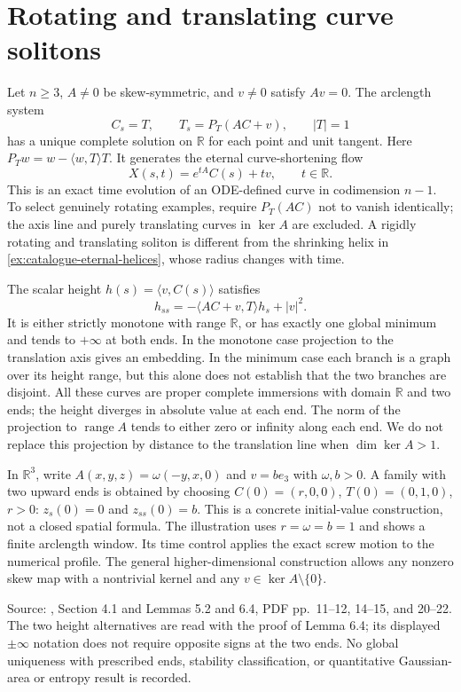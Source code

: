 \chapter{Rotating and translating curve solitons}\label{sec:catalogue-rotating-translating-curves}
\begin{example}\label{ex:catalogue-rotating-translating-curves}
Let $n\geq3$, $A\ne0$ be skew-symmetric, and $v\ne0$ satisfy $Av=0$. The arclength system
\[
 C_s=T,\qquad T_s=P_T(AC+v),\qquad |T|=1
\]
has a unique complete solution on $\mathbb R$ for each point and unit tangent. Here $P_Tw=w-\langle w,T\rangle T$. It generates the eternal curve-shortening flow
\[
 X(s,t)=e^{tA}C(s)+tv,\qquad t\in\mathbb R.
\]
This is an exact time evolution of an ODE-defined curve in codimension $n-1$. To select genuinely rotating examples, require $P_T(AC)$ not to vanish identically; the axis line and purely translating curves in $\ker A$ are excluded. A rigidly rotating and translating soliton is different from the shrinking helix in \ref{ex:catalogue-eternal-helices}, whose radius changes with time.

The scalar height $h(s)=\langle v,C(s)\rangle$ satisfies
\[
 h_{ss}=-\langle AC+v,T\rangle h_s+|v|^2.
\]
It is either strictly monotone with range $\mathbb R$, or has exactly one global minimum and tends to $+\infty$ at both ends. In the monotone case projection to the translation axis gives an embedding. In the minimum case each branch is a graph over its height range, but this alone does not establish that the two branches are disjoint. All these curves are proper complete immersions with domain $\mathbb R$ and two ends; the height diverges in absolute value at each end. The norm of the projection to $\operatorname{range}A$ tends to either zero or infinity along each end. We do not replace this projection by distance to the translation line when $\dim\ker A>1$.

In $\mathbb R^3$, write $A(x,y,z)=\omega(-y,x,0)$ and $v=be_3$ with $\omega,b>0$. A family with two upward ends is obtained by choosing $C(0)=(r,0,0)$, $T(0)=(0,1,0)$, $r>0$: $z_s(0)=0$ and $z_{ss}(0)=b$. This is a concrete initial-value construction, not a closed spatial formula. The illustration uses $r=\omega=b=1$ and shows a finite arclength window. Its time control applies the exact screw motion to the numerical profile. The general higher-dimensional construction allows any nonzero skew map with a nontrivial kernel and any $v\in\ker A\setminus\{0\}$.

Source: \cite{CatAAAW13}, Section 4.1 and Lemmas 5.2 and 6.4, PDF pp.~11--12, 14--15, and 20--22. The two height alternatives are read with the proof of Lemma 6.4; its displayed $\pm\infty$ notation does not require opposite signs at the two ends. No global uniqueness with prescribed ends, stability classification, or quantitative Gaussian-area or entropy result is recorded.
\end{example}

